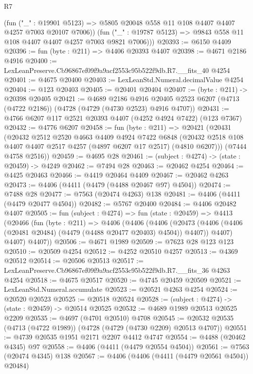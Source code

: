 \begin{lexlean}{R7}
\begin{coremodule}
          (fun ("_" : @19901 @5123) =>
          @5805 @20048 @558 @11 @108 @4407 @4407 @4257 @7003 @20107 @7006))
        (fun ("_" : @19787 @5123) => @9843 @558 @11 @108 @4407 @4407 @4257 @7003 @9821 @7006)))
@20393 := @6150 @4409
@20396 := fun (byte : @211) => @4406 @20393 @4407
@20398 := @4671 @2186 @4916
@20400 := LexLeanPreserve.Cb96867ef09f9a9acf2553c95b522f9db.R7.__fits_40 @4254
@20401 := @4675 @20400
@20403 := LexLeanStd.Numeral.decimalValue @4254
@20404 := @123 @20403
@20405 := @20401 @20404
@20407 := (byte : @211) -> @20398 @20405
@20421 := @4689
    @2186
    @4916
    @20405
    @2523
    @6207
    (@4713 (@4722 @2186))
    (@4728 (@4729 (@4730 @2523) @4916 @4707))
@20431 := @4766 @6207 @117 @2521 @20393 @4407 (@4252 @4924 @7422) (@123 @7367)
@20432 := @4776 @6207
@20458 := fun (byte : @211) =>
  @20421
    (@20431
      (@20432
        @2512
        @2520
        @4663
        @4409
        @4924
        @7422
        @6848
        (@20432 @2518 @108 @4407 @4407 @2517 @4257 (@4897 @6207 @17 @2517) (@4810 @6207)))
      (@7444 @4758 @2516))
@20459 := @4695 @28
@20461 := (subject : @4274) -> (state : @20459) -> @4249
@20462 := @7494 @28
@20463 := @20462 @4254
@20464 := @4425 @20463
@20466 := @4419 @20464 @4409
@20467 := @20462 @4263
@20473 := @4406 (@4411 (@4479 (@4488 @20467 @97) @4504))
@20474 := @7488 @28
@20477 := @7563 (@20474 @4263) @138
@20481 := @4406 (@4411 (@4479 @20477 @4504))
@20482 := @5767 @20400
@20484 := @4406 @20482 @4407
@20505 := fun (subject : @4274) =>
  fun (state : @20459) =>
  @4413
    (@20466
      (fun (byte : @211) =>
      @4406
        (@4406
          (@4406
            (@20473 (@4406 (@4406 (@20481 @20484) (@4479 (@4488 @20477 @20403) @4504)) @4407))
            @4407)
          @4407)
        @4407))
@20506 := @4671 @1989
@20509 := @7623 @28 @123 @123
@20510 := @20509 @4254
@20512 := @4252 @20510 @4257
@20513 := @4369 @20512
@20514 := @20506 @20513
@20517 := LexLeanPreserve.Cb96867ef09f9a9acf2553c95b522f9db.R7.__fits_36 @4263 @4254
@20518 := @4675 @20517
@20520 := @4745 @20459 @20509
@20521 := LexLeanStd.Numeral.accumulate
@20523 := @20521 @4263 @4254
@20524 := @20520 @20523
@20525 := @20518 @20524
@20528 := (subject : @4274) -> (state : @20459) -> @20514 @20525
@20532 := @4689 @1989 @20513 @20525 @2209
@20535 := @4697 (@4701 @20510) @4708
@20545 := @20532 @20535 (@4713 (@4722 @1989)) (@4728 (@4729 (@4730 @2209) @20513 @4707))
@20551 := @4739 @20535 @1951 @2171 @2207 @4412 @4747
@20554 := @4488 (@20462 @4345) @97
@20558 := @4406 (@4411 (@4479 @20554 @4504))
@20561 := @7563 (@20474 @4345) @138
@20567 := @4406 (@4406 (@4411 (@4479 @20561 @4504)) @20484)

\end{coremodule}
\end{lexlean}
